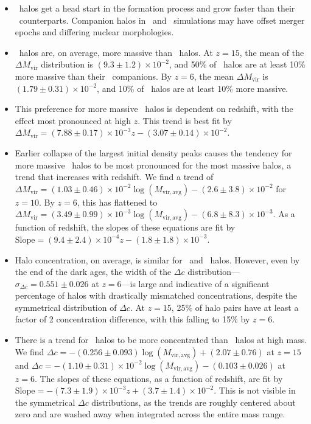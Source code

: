 \begin{itemize}
	\item  \lpt\ halos get a head start in the formation process and grow faster than their \za\ counterparts.  Companion halos in \lpt\ and \za\ simulations may have offset merger epochs and differing nuclear morphologies.
	\item  \lpt\ halos are, on average, more massive than \za\ halos.  At $z = 15$, the mean of the $\Delta M_{\mathrm{vir}}$ distribution is $(9.3 \pm 1.2) \times 10^{-2}$, and 50\% of \lpt\ halos are at least 10\% more massive than their \za\ companions.  By $z = 6$, the mean $\Delta M_{\mathrm{vir}}$ is $(1.79 \pm 0.31) \times 10^{-2}$, and 10\% of \lpt\ halos are at least 10\% more massive.
	\item  This preference for more massive \lpt\ halos is dependent on redshift, with the effect most pronounced at high $z$.  This trend is best fit by $\Delta M_{\mathrm{vir}} = (7.88 \pm 0.17) \times 10^{-3} z - (3.07 \pm 0.14) \times 10^{-2}$.
	\item  Earlier collapse of the largest initial density peaks causes the tendency for more massive \lpt\ halos to be most pronounced for the most massive halos, a trend that increases with redshift. We find a trend of $\Delta M_{\mathrm{vir}} = (1.03 \pm 0.46) \times 10^{-2} \log(M_{\mathrm{vir,avg}}) - (2.6 \pm 3.8) \times 10^{-2}$ for $z = 10$.  By $z = 6$, this has flattened to $\Delta M_{\mathrm{vir}} = (3.49 \pm 0.99) \times 10^{-3} \log(M_{\mathrm{vir,avg}}) - (6.8 \pm 8.3) \times 10^{-3}$.  As a function of redshift, the slopes of these equations are fit by $\mathrm{Slope} = (9.4 \pm 2.4) \times 10^{-4} z - (1.8 \pm 1.8) \times 10^{-3}$.
	\item  Halo concentration, on average, is similar for \lpt\ and \za\ halos.  However, even by the end of the dark ages, the width of the $\Delta c$ distribution---$\sigma_{\Delta c} = 0.551 \pm 0.026$ at $z = 6$---is large and indicative of a significant percentage of halos with drastically mismatched concentrations, despite the symmetrical distribution of $\Delta c$.  At $z = 15$, 25\% of halo pairs have at least a factor of 2 concentration difference, with this falling to 15\% by $z = 6$.
	\item  There is a trend for \za\ halos to be more concentrated than \lpt\ halos at high mass.  We find $\Delta c = -(0.256 \pm 0.093) \log(M_{\mathrm{vir,avg}}) + (2.07 \pm 0.76)$ at $z = 15$ and $\Delta c = -(1.10 \pm 0.31) \times 10^{-2} \log(M_{\mathrm{vir,avg}}) - (0.103 \pm 0.026)$ at $z = 6$.  The slopes of these equations, as a function of redshift, are fit by $\mathrm{Slope} = -(7.3 \pm 1.9) \times 10^{-3} z + (3.7 \pm 1.4) \times 10^{-2}$.  This is not visible in the symmetrical $\Delta c$ distributions, as the trends are roughly centered about zero and are washed away when integrated across the entire mass range.
\end{itemize}

